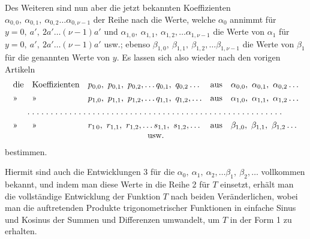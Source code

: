 \begin{landscape}
\par\noindent\hspace*{\parindent}Des Weiteren sind nun aber die jetzt bekannten Koeffizienten \(\alpha_{0,0},\ \alpha_{0,1},\ \alpha_{0,2}\ldots\alpha_{0,\nu-1}\) der Reihe nach die Werte, welche \(\alpha_0\) annimmt für \(y=0,\ a',\ 2a'\ldots(\nu-1)a'\) und \(\alpha_{1,0},\ \alpha_{1,1},\ \alpha_{1,2},\ldots\alpha_{1,\nu-1}\) die Werte von \(\alpha_1\) für \(y=0,\ a',\ 2a'\ldots(\nu-1)a'\) usw.; ebenso \(\beta_{1,0},\ \beta_{1,1},\ \beta_{1,2},\ldots\beta_{1,\nu-1}\) die Werte von \(\beta_1\) für die genannten Werte von \(y\). Es lassen sich also wieder nach den vorigen Artikeln
\[
\begin{array}{@{}ll@{\quad}l@{\quad}l@{\quad}l@{}}
\text{die}&\text{Koeffizienten}&p_{0,0},\ p_{0,1},\ p_{0,2},\ldots q_{0,1},\ q_{0,2}\ldots&\text{aus}&\alpha_{0,0},\ \alpha_{0,1},\ \alpha_{0,2}\ldots\\[4pt]
\text{»}&\text{»}&p_{1,0},\ p_{1,1},\ p_{1,2},\ldots q_{1,1},\ q_{1,2},\ldots&\text{aus}&\alpha_{1,0},\ \alpha_{1,1},\ \alpha_{1,2}\ldots\\[4pt]
\multicolumn{5}{@{}c@{}}{\VFiveTenPoints\VFiveTenPoints\VFiveTenPoints\VFiveTenPoints\VFiveTenPoints\VFivePoint\VFivePoint\VFivePoint\VFivePoint\VFivePoint}\\[4pt]
\text{»}&\text{»}&r_{1\,0},\ r_{1,1},\ r_{1,2},\ldots s_{1,1},\ s_{1,2},\ldots&\text{aus}&\beta_{1,0},\ \beta_{1,1},\ \beta_{1,2}\ldots\\
\multicolumn{5}{c}{\text{usw.}}
\end{array}
\]
bestimmen.

\par\noindent\hspace*{\parindent}Hiermit sind auch die Entwicklungen 3 für die \(\alpha_0,\ \alpha_1,\ \alpha_2,\ldots\beta_1,\ \beta_2,\ldots\) vollkommen bekannt, und indem man diese Werte in die Reihe 2 für \(T\) einsetzt, erhält man die vollständige Entwicklung der Funktion \(T\) nach beiden Veränderlichen, wobei man die auftretenden Produkte trigonometrischer Funktionen in einfache Sinus und Kosinus der Summen und Differenzen umwandelt, um \(T\) in der Form 1 zu erhalten.


\end{landscape}
